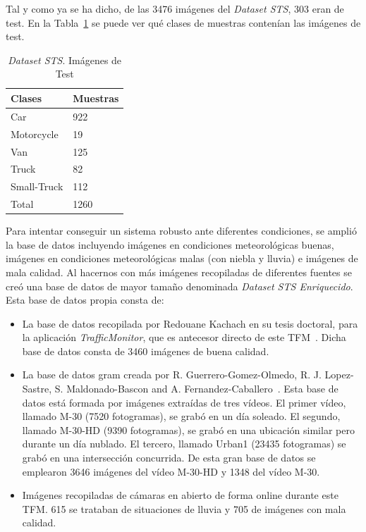 Tal y como ya se ha dicho, de las 3476 imágenes del \textit{Dataset STS}, 303 eran de test. En la Tabla~\ref{tabla_datos_primera_evaluacion} se puede ver qué clases de muestras contenían las imágenes de test.

\begin{table}[H]
\begin{center}
\begin{tabular}{|l|l|}
\hline
Clases & Muestras \\
\hline \hline
Car & 922 \\ \hline
Motorcycle & 19 \\ \hline
Van & 125 \\ \hline
Truck & 82 \\ \hline
Small-Truck & 112 \\ \hline
Total & 1260 \\ \hline
\end{tabular}
\caption{\textit{Dataset STS}. Imágenes de Test}
\label{tabla_datos_primera_evaluacion}
\end{center}
\end{table}

Para intentar conseguir un sistema robusto ante diferentes condiciones, se amplió la base de datos incluyendo imágenes en condiciones meteorológicas buenas, imágenes en condiciones meteorológicas malas (con niebla y lluvia) e imágenes de mala calidad. Al hacernos con más imágenes recopiladas de diferentes fuentes se creó una base de datos de mayor tamaño denominada \textit{Dataset STS Enriquecido}. Esta base de datos propia consta de:
\begin{itemize}
    \item La base de datos recopilada por Redouane Kachach en su tesis doctoral, para la aplicación \textit{TrafficMonitor}, que es antecesor directo de este TFM~\cite{traffic_monitor_lab}. Dicha base de datos consta de 3460 imágenes de buena calidad.
    \item La base de datos \acrfull{gram} creada por R. Guerrero-Gomez-Olmedo, R. J. Lopez-Sastre, S. Maldonado-Bascon and A. Fernandez-Caballero~\cite{guerrero2013iwinac}. Esta base de datos está formada por imágenes extraídas de tres vídeos. El primer vídeo, llamado M-30 (7520 fotogramas), se grabó en un día soleado. El segundo, llamado M-30-HD (9390 fotogramas), se grabó en una ubicación similar pero durante un día nublado. El tercero, llamado Urban1 (23435 fotogramas) se grabó en una intersección concurrida. De esta gran base de datos se emplearon 3646 imágenes del vídeo M-30-HD y 1348 del vídeo M-30.
    \item Imágenes recopiladas de cámaras en abierto de forma online durante este TFM. 615 se trataban de situaciones de lluvia y 705 de imágenes con mala calidad.
\end{itemize} 

